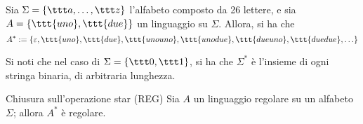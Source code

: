 \documentclass[a4paper, 12pt]{report}
\begin{document}
    \begin{example}[Star]
        Sia $\Sigma = \{\ttt a , \ldots, \ttt z\}$ l'alfabeto composto da 26 lettere, e sia $A = \{\ttt{uno}, \ttt{due}\}$ un linguaggio su $\Sigma$. Allora, si ha che $$A^* := \{\varepsilon, \ttt{uno}, \ttt{due}, \ttt{unouno}, \ttt{unodue}, \ttt{dueuno}, \ttt{duedue}, \ldots\}$$
    \end{example}
   
    \begin{example}
        Si noti che nel caso di $\Sigma = \{ \ttt 0, \ttt 1 \}$, si ha che $\Sigma^*$ è l'insieme di ogni stringa binaria, di arbitraria lunghezza.
    \end{example}

    \begin{framedprop}[label={closure star}]{Chiusura sull'operazione star (REG)}
        Sia $A$ un linguaggio regolare su un alfabeto $\Sigma$; allora $A^*$ è regolare.
    \end{framedprop}
\end{document}
